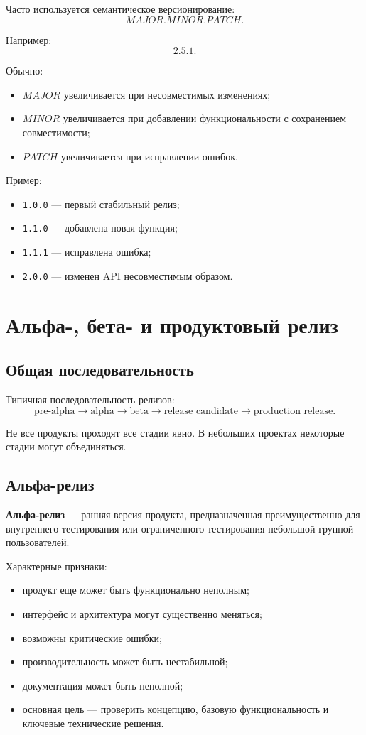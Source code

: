 \documentclass[12pt,a4paper]{article}
\begin{document}
Часто используется семантическое версионирование:
\[
MAJOR.MINOR.PATCH.
\]

Например:
\[
2.5.1.
\]

Обычно:
\begin{itemize}
    \item $MAJOR$ увеличивается при несовместимых изменениях;
    \item $MINOR$ увеличивается при добавлении функциональности с сохранением совместимости;
    \item $PATCH$ увеличивается при исправлении ошибок.
\end{itemize}

Пример:
\begin{itemize}
    \item \texttt{1.0.0} --- первый стабильный релиз;
    \item \texttt{1.1.0} --- добавлена новая функция;
    \item \texttt{1.1.1} --- исправлена ошибка;
    \item \texttt{2.0.0} --- изменен API несовместимым образом.
\end{itemize}

\section{Альфа-, бета- и продуктовый релиз}

\subsection{Общая последовательность}

Типичная последовательность релизов:
\[
\text{pre-alpha}
\rightarrow
\text{alpha}
\rightarrow
\text{beta}
\rightarrow
\text{release candidate}
\rightarrow
\text{production release}.
\]

Не все продукты проходят все стадии явно. В небольших проектах некоторые стадии могут объединяться.

\subsection{Альфа-релиз}

\textbf{Альфа-релиз} --- ранняя версия продукта, предназначенная преимущественно для внутреннего тестирования или ограниченного тестирования небольшой группой пользователей.

Характерные признаки:
\begin{itemize}
    \item продукт еще может быть функционально неполным;
    \item интерфейс и архитектура могут существенно меняться;
    \item возможны критические ошибки;
    \item производительность может быть нестабильной;
    \item документация может быть неполной;
    \item основная цель --- проверить концепцию, базовую функциональность и ключевые технические решения.
\end{itemize}
\end{document}
